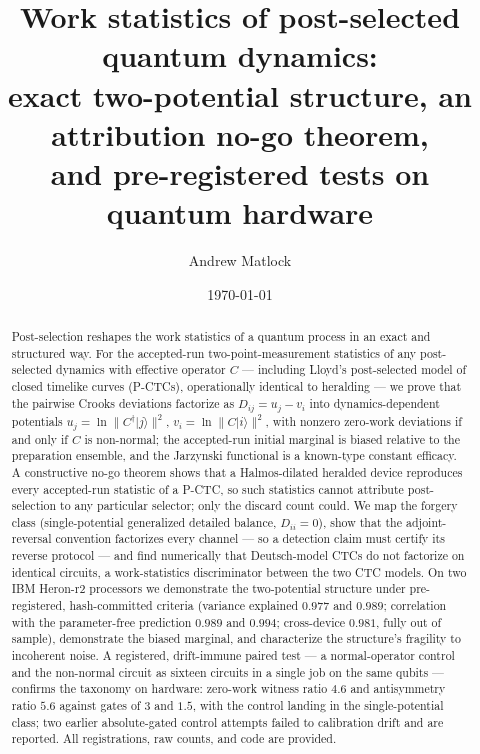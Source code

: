 \documentclass[aps,pra,twocolumn,superscriptaddress,nofootinbib]{revtex4-2}
\begin{document}
\title{Work statistics of post-selected quantum dynamics:\\
exact two-potential structure, an attribution no-go theorem,\\ and pre-registered tests on quantum hardware}

\author{Andrew Matlock}

\date{\today}

\begin{abstract}
Post-selection reshapes the work statistics of a quantum process in an exact and structured way. For the accepted-run two-point-measurement statistics of any post-selected dynamics with effective operator $C$ --- including Lloyd's post-selected model of closed timelike curves (P-CTCs), operationally identical to heralding --- we prove that the pairwise Crooks deviations factorize as $D_{ij}=u_j-v_i$ into dynamics-dependent potentials $u_j=\ln\lVert C^\dagger|j\rangle\rVert^2$, $v_i=\ln\lVert C|i\rangle\rVert^2$, with nonzero zero-work deviations if and only if $C$ is non-normal; the accepted-run initial marginal is biased relative to the preparation ensemble, and the Jarzynski functional is a known-type constant efficacy. A constructive no-go theorem shows that a Halmos-dilated heralded device reproduces every accepted-run statistic of a P-CTC, so such statistics cannot attribute post-selection to any particular selector; only the discard count could. We map the forgery class (single-potential generalized detailed balance, $D_{ii}=0$), show that the adjoint-reversal convention factorizes every channel --- so a detection claim must certify its reverse protocol --- and find numerically that Deutsch-model CTCs do not factorize on identical circuits, a work-statistics discriminator between the two CTC models. On two IBM Heron-r2 processors we demonstrate the two-potential structure under pre-registered, hash-committed criteria (variance explained $0.977$ and $0.989$; correlation with the parameter-free prediction $0.989$ and $0.994$; cross-device $0.981$, fully out of sample), demonstrate the biased marginal, and characterize the structure's fragility to incoherent noise. A registered, drift-immune paired test --- a normal-operator control and the non-normal circuit as sixteen circuits in a single job on the same qubits --- confirms the taxonomy on hardware: zero-work witness ratio $4.6$ and antisymmetry ratio $5.6$ against gates of $3$ and $1.5$, with the control landing in the single-potential class; two earlier absolute-gated control attempts failed to calibration drift and are reported. All registrations, raw counts, and code are provided.
\end{abstract}
\end{document}
